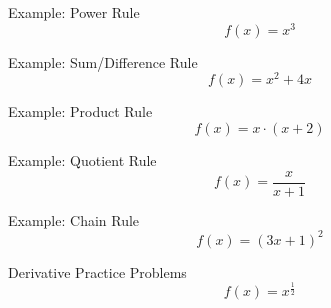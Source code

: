 \documentclass[aspectratio=169]{beamer}
\begin{document}
\begin{frame}{Example: Power Rule}\label{power_rule}
	\vspace{-4cm}
    \[
    f(x) = x^3
    \]
\end{frame}

\begin{frame}{Example: Sum/Difference Rule}\label{sum_diff_rule}
	\vspace{-4cm}
    \[
    f(x) = x^2 + 4x
    \]
\end{frame}

\begin{frame}{Example: Product Rule}\label{product_rule}
	\vspace{-4cm}
    \[
    f(x) = x \cdot (x + 2)
    \]
\end{frame}

\begin{frame}{Example: Quotient Rule}\label{quotient_rule}
	\vspace{-4cm}
    \[
    f(x) = \frac{x}{x+1}
    \]
\end{frame}

\begin{frame}{Example: Chain Rule}\label{chain_rule}
	\vspace{-4cm}
    \[
    f(x) = (3x + 1)^2
    \]
\end{frame}

\begin{frame}{Derivative Practice Problems}\label{main1}
	\vspace{-4cm}
    \[
    f(x) = x^{\frac{1}{2}}
    \]
\end{frame}
\end{document}

